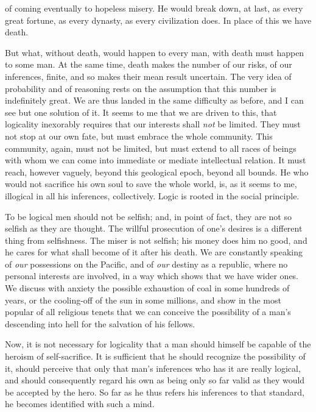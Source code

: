 of coming eventually to hopeless misery. He would break down, at last, as every great fortune, as every dynasty, as every civilization does. In place of this we have death.

But what, without death, would happen to every man, with death must happen to some man. At the same time, death makes the number of our risks, of our inferences, finite, and so makes their mean result uncertain. The very idea of probability and of reasoning rests on the assumption that this number is indefinitely great. We are thus landed in the same difficulty as before, and I can see but one solution of it. It seems to me that we are driven to this, that logicality inexorably requires that our interests shall \emph{not} be limited. They must not stop at our own fate, but must embrace the whole community. This community, again, must not be limited, but must extend to all races of beings with whom we can come into immediate or mediate intellectual relation. It must reach, however vaguely, beyond this geological epoch, beyond all bounds. He who would not sacrifice his own soul to save the whole world, is, as it seems to me, illogical in all his inferences, collectively. Logic is rooted in the social principle.

To be logical men should not be selfish; and, in point of fact, they are not so selfish as they are thought. The willful prosecution of one's desires is a different thing from selfishness. The miser is not selfish; his money does him no good, and he cares for what shall become of it after his death. We are constantly speaking of \emph{our} possessions on the Pacific, and of \emph{our} destiny as a republic, where no personal interests are involved, in a way which shows that we have wider ones. We discuss with anxiety the possible exhaustion of coal in some hundreds of years, or the cooling-off of the sun in some millions, and show in the most popular of all religious tenets that we can conceive the possibility of a man's descending into hell for the salvation of his fellows.

Now, it is not necessary for logicality that a man should himself be capable of the heroism of self-sacrifice. It is sufficient that he should recognize the possibility of it, should perceive that only that man's inferences who has it are really logical, and should consequently regard his own as being only so far valid as they would be accepted by the hero. So far as he thus refers his inferences to that standard, he becomes identified with such a mind.

